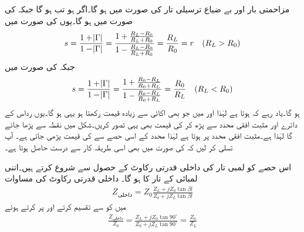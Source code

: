 مزاحمتی بار  اور بے ضیاع ترسیلی تار کی صورت میں  ہو گا۔اگر  ہو تب 
 ہو گا جبکہ   کی صورت میں  ہو گا۔یوں  کی صورت میں
\begin{align*}
s=\frac{1+\abs{\Gamma}}{1-\abs{\Gamma}}=\frac{1+\frac{R_L-R_0}{R_L+R_0}}{1-\frac{R_L-R_0}{R_L+R_0}}=\frac{R_L}{R_0}=r \quad{(R_L>R_0)}
\end{align*}
جبکہ  کی صورت میں
\begin{align*}
s=\frac{1+\abs{\Gamma}}{1-\abs{\Gamma}}=\frac{1+\frac{R_0-R_L}{R_0+R_L}}{1-\frac{R_0-R_L}{R_0+R_L}}=\frac{R_0}{R_L} \quad{(R_L<R_0)}
\end{align*}
ہو گا۔یاد رہے کہ  ہوتا ہے لہٰذا  اور  میں جو بھی اکائی سے زیادہ قیمت رکھتا ہو یہی  ہو گا۔یوں  رداس کے دائرے اور مثبت افقی محدد سے  پڑھ کر  کی قیمت بھی یہی تصور کریں۔شکل  میں نقطہ  سے  پڑھا جائے گا لہٰذا  ہے۔مثبت افقی محدد پر  ہوتا ہے لہٰذا محدد کے اسی حصے سے  کی قیمت پڑھی جاتی ہے۔ آپ تسلی کر لیں کہ  کی صورت میں بھی اسی طریقہ کار سے درست  حاصل ہوتا ہے۔

اس حصے کو  لمبی تار کی داخلی قدرتی رکاوٹ کے حصول سے شروع کرتے ہیں۔اتنی لمبائی کے تار کا  ہو گا۔ داخلی قدرتی رکاوٹ کی مساوات
\begin{align*}
Z_{\text{داخلی}}=Z_{0} \frac{Z_{L}+j Z_{0}\tan \beta l}{Z_{0}+j Z_{L}\tan \beta l}
\end{align*}
میں  کو  سے تقسیم کرتے اور   پر کرتے ہوئے
\begin{align*}
\frac{Z_{\text{داخلی}}}{Z_{0}}= \frac{Z_{L}+j Z_{0}\tan 90^\circ}{Z_{0}+j Z_{L}\tan 90^\circ}=\frac{Z_0}{Z_L}
\end{align*}

